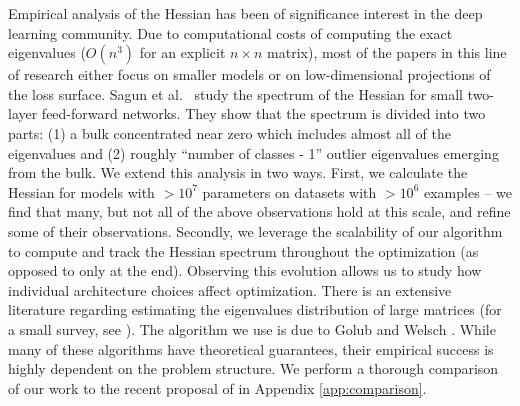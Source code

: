 \documentclass{article}
\begin{document}
Empirical analysis of the Hessian has been of significance interest in the deep learning community. Due to computational costs of computing the exact eigenvalues ($O(n^3)$ for an explicit $n \times n$ matrix), most of the papers in this line of research either focus on smaller models or on low-dimensional projections of the loss surface. Sagun et al.\ \cite{sagun2016eigenvalues, sagun2017empirical} study the spectrum of the Hessian for small two-layer feed-forward networks. They show that the spectrum is divided into two parts: (1) a bulk concentrated near zero which includes almost all of the eigenvalues and (2) roughly ``number of classes - 1'' outlier eigenvalues emerging from the bulk. We extend this analysis in two ways. First, we calculate the Hessian for models with $>10^7$ parameters on datasets with $>10^6$ examples -- we find that many, but not all of the above observations hold at this scale, and refine some of their observations. Secondly, we leverage the scalability of our algorithm to compute and track the Hessian spectrum throughout the optimization (as opposed to only at the end). Observing this evolution allows us to study how individual architecture choices affect optimization. There is an extensive literature regarding estimating the eigenvalues distribution of large matrices (for a small survey, see \cite{lin2016approximating}). The algorithm we use is due to Golub and Welsch \cite{golub1969calculation}. While many of these algorithms have theoretical guarantees, their empirical success is highly dependent on the problem structure. We perform a thorough comparison of our work to the recent proposal of \cite{adams2018estimating} in Appendix \ref{app:comparison}.
\end{document}
